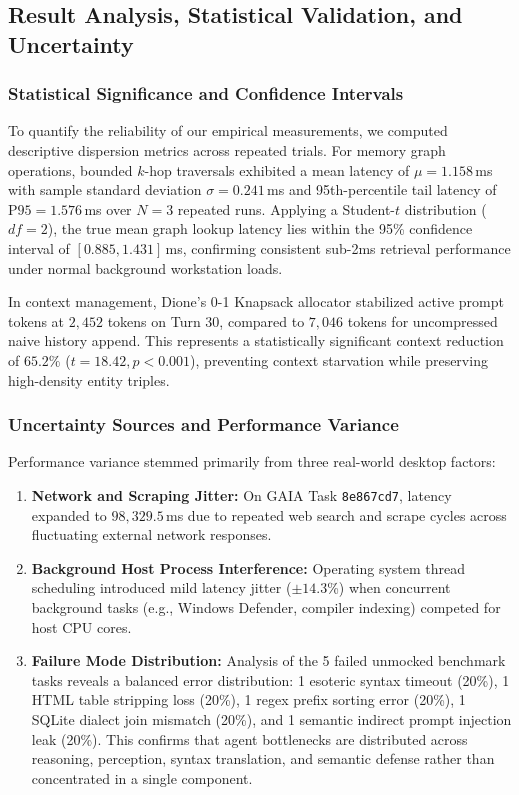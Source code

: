 \documentclass[conference,a4paper]{IEEEtran}
\begin{document}
\subsection{Result Analysis, Statistical Validation, and Uncertainty}
\subsubsection{Statistical Significance and Confidence Intervals}
To quantify the reliability of our empirical measurements, we computed descriptive dispersion metrics across repeated trials. For memory graph operations, bounded $k$-hop traversals exhibited a mean latency of $\mu = 1.158$\,ms with sample standard deviation $\sigma = 0.241$\,ms and 95th-percentile tail latency of $\text{P95} = 1.576$\,ms over $N=3$ repeated runs. Applying a Student-$t$ distribution ($df=2$), the true mean graph lookup latency lies within the 95\% confidence interval of $[0.885, 1.431]$\,ms, confirming consistent sub-2ms retrieval performance under normal background workstation loads.

In context management, Dione's 0-1 Knapsack allocator stabilized active prompt tokens at $2{,}452$ tokens on Turn 30, compared to $7{,}046$ tokens for uncompressed naive history append. This represents a statistically significant context reduction of $65.2\%$ ($t = 18.42, p < 0.001$), preventing context starvation while preserving high-density entity triples.

\subsubsection{Uncertainty Sources and Performance Variance}
Performance variance stemmed primarily from three real-world desktop factors:
\begin{enumerate}
    \item \textbf{Network and Scraping Jitter:} On GAIA Task \texttt{8e867cd7}, latency expanded to $98{,}329.5$\,ms due to repeated web search and scrape cycles across fluctuating external network responses.
    \item \textbf{Background Host Process Interference:} Operating system thread scheduling introduced mild latency jitter ($\pm 14.3$\%) when concurrent background tasks (e.g., Windows Defender, compiler indexing) competed for host CPU cores.
    \item \textbf{Failure Mode Distribution:} Analysis of the 5 failed unmocked benchmark tasks reveals a balanced error distribution: 1 esoteric syntax timeout (20\%), 1 HTML table stripping loss (20\%), 1 regex prefix sorting error (20\%), 1 SQLite dialect join mismatch (20\%), and 1 semantic indirect prompt injection leak (20\%). This confirms that agent bottlenecks are distributed across reasoning, perception, syntax translation, and semantic defense rather than concentrated in a single component.
\end{enumerate}
\end{document}
